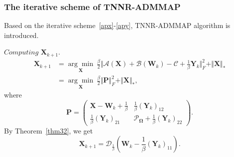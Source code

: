 \documentclass[fontset=windows]{article}
\begin{document}
{%

\subsubsection{The iterative scheme of TNNR-ADMMAP}
Based on the iterative scheme~\eqref{apx}-\eqref{apy}, TNNR-ADMMAP algorithm is introduced.

$\textit{Computing}$  $\mathbf X_{k+1}$.
\begin{equation}
    \begin{aligned}
            \mathbf X_{k+1} & = \underset{\mathbf X}{\arg\min}\ \frac{\beta}{2}\Vert \mathcal{A}(\mathbf X) + \mathcal{B}(\mathbf W_k) - \mathcal{C} + \frac{1}{\beta}\mathbf Y_{k} \Vert_F^2 + \Vert\mathbf X \Vert_* \\
            & = \underset{\mathbf X}{\arg\min}\ \frac{\beta}{2}\Vert \mathbf P \Vert^2_F + \Vert\mathbf X \Vert_*,
    \end{aligned}
\end{equation}
where 
\begin{equation*}
    \mathbf P = \begin{pmatrix}
        \mathbf X- \mathbf W_k + \frac{1}{\beta} & \frac{1}{\beta} (\mathbf Y_k)_{12} \\
        \frac{1}{\beta}(\mathbf Y_k)_{21} & \mathcal{P}_{\mathbf\Omega} + \frac{1}{\beta}(\mathbf Y_k)_{22}
    \end{pmatrix}.
\end{equation*}
By Theorem~\eqref{thm32}, we get
\begin{equation}
    \mathbf X_{k+1} = \mathcal{D}_{\frac{1}{\beta}}\left(\mathbf W_k - \frac{1}{\beta}(\mathbf Y_k)_{11}\right).
\end{equation}

}
\end{document}

